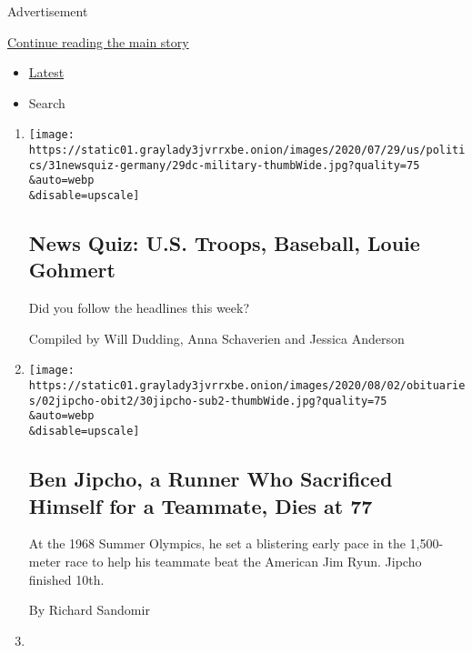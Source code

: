 Advertisement

\protect\hyperlink{after-mid2}{Continue reading the main story}

\begin{itemize}
\tightlist
\item
  \protect\hyperlink{stream-panel}{Latest}
\item
  Search
\end{itemize}

\begin{enumerate}
\def\labelenumi{\arabic{enumi}.}
\item
  \href{/interactive/2020/07/31/briefing/troops-baseball-louie-gohmert-news-quiz.html}{}

  \texttt{[image: https://static01.graylady3jvrrxbe.onion/images/2020/07/29/us/politics/31newsquiz-germany/29dc-military-thumbWide.jpg?quality=75\\\&auto=webp\\\&disable=upscale]}

  \hypertarget{news-quiz-us-troops-baseball-louie-gohmert}{%
  \subsection{News Quiz: U.S. Troops, Baseball, Louie
  Gohmert}\label{news-quiz-us-troops-baseball-louie-gohmert}}

  Did you follow the headlines this week?

  Compiled by Will Dudding, Anna Schaverien and Jessica Anderson
\item
  \href{/2020/07/30/sports/olympics/ben-jipcho-dead.html}{}

  \texttt{[image: https://static01.graylady3jvrrxbe.onion/images/2020/08/02/obituaries/02jipcho-obit2/30jipcho-sub2-thumbWide.jpg?quality=75\\\&auto=webp\\\&disable=upscale]}

  \hypertarget{ben-jipcho-a-runner-who-sacrificed-himself-for-a-teammate-dies-at-77}{%
  \subsection{Ben Jipcho, a Runner Who Sacrificed Himself for a
  Teammate, Dies at
  77}\label{ben-jipcho-a-runner-who-sacrificed-himself-for-a-teammate-dies-at-77}}

  At the 1968 Summer Olympics, he set a blistering early pace in the
  1,500-meter race to help his teammate beat the American Jim Ryun.
  Jipcho finished 10th.

  By Richard Sandomir
\item
  \href{/2020/07/30/world/asia/lee-teng-hui-dead.html}{}


\end{enumerate}
